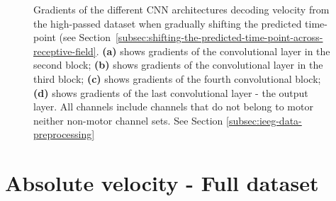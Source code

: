 \begin{figure}[!htpb]
\caption[]{Gradients of the different CNN architectures decoding velocity from the high-passed dataset when gradually shifting the predicted time-point (see Section~\ref{subsec:shifting-the-predicted-time-point-across-receptive-field}. \textbf{(a)} shows gradients of the convolutional layer in the second block; \textbf{(b)} shows gradients of the convolutional layer in the third block; \textbf{(c)} shows gradients of the fourth convolutional block; \textbf{(d)} shows gradients of the last convolutional layer - the output layer. All channels include channels that do not belong to motor neither non-motor channel sets. See Section \ref{subsec:ieeg-data-preprocessing}}
\label{fig:vel-hp-shifting-grads}
\end{figure}
\clearpage
\section*{Absolute velocity - Full dataset}\label{sec:absolute-velocity-appendixC}

